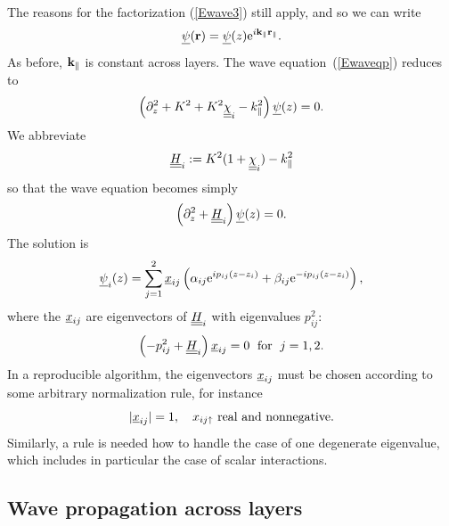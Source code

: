 The reasons for the factorization (\ref{Ewave3}) still apply,
and so we can write
\begin{equation}\label{Ewave3p}
\underline{\psi}(\mathbf{r}) = \underline{\psi}(z) \text{e}^{i \mathbf{k}_\parallel\mathbf{r}_\parallel}.
\end{equation}
As before, $\mathbf{k}_\parallel$ is constant across layers.
The wave equation~(\ref{Ewaveqp}) reduces to 
\begin{equation}\label{Ewavezp}
\left(\partial_z^2 + K^2 + K^2\underline{\underline{\chi}}_i - k_\parallel^2 \right) \underline{\psi}(z) = 0.
\end{equation}
We abbreviate
\begin{equation}
  \underline{\underline{H}}_i := K^2(1+\underline{\underline{\chi}}_i)-k_\parallel^2
\end{equation}
so that the wave equation becomes simply
\begin{equation}\label{Ewaveqp2}
  \left(\partial_z^2 + \underline{\underline{H}}_i\right) \underline{\psi}(z) = 0.
\end{equation}
The solution is
\begin{equation}\label{Epsizp}
  \underline{\psi}_i(z)
  = \sum_{j=1}^2 \underline{x}_{ij}\left(\alpha_{ij}\text{e}^{i p_{ij}(z-z_i)}
                            + \beta_{ij}\text{e}^{-i p_{ij}(z-z_i)}\right),
\end{equation}
where the $\underline{x}_{ij}$ are eigenvectors of $\underline{\underline{H}}_i$
with eigenvalues $p_{ij}^2$:
\begin{equation}
  \left( -p_{ij}^2 + \underline{\underline{H}}_i \right) \underline{x}_{ij} = 0
   \;\text{ for }\;j=1,2.
\end{equation}
In a reproducible algorithm,
the eigenvectors $\underline{x}_{ij}$ must be chosen according to some arbitrary
normalization rule,
for instance
\begin{equation}
  |\underline{x}_{ij}|=1,\quad x_{ij\uparrow} \text{ real and nonnegative}.
\end{equation}
Similarly,
a rule is needed how to handle the case of one degenerate eigenvalue,
which includes in particular the case of scalar interactions.


\subsection{Wave propagation across layers}

